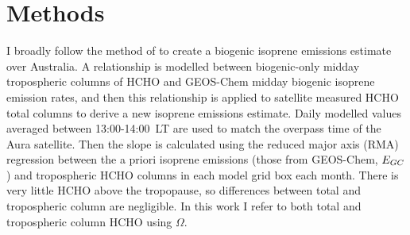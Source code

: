 \section{Methods}
  \label{BioIsop:method}
  
  
  I broadly follow the method of \textcite{Palmer2001} to create a biogenic isoprene emissions estimate over Australia.
  A relationship is modelled between biogenic-only midday tropospheric columns of HCHO and GEOS-Chem midday biogenic isoprene emission rates, and then this relationship is applied to satellite measured HCHO total columns to derive a new isoprene emissions estimate.
  Daily modelled values averaged between 13:00-14:00~LT are used to match the overpass time of the Aura satellite.
  Then the slope is calculated using the reduced major axis (RMA) regression between the a priori isoprene emissions (those from GEOS-Chem, $E_{GC}$) and tropospheric HCHO columns in each model grid box each month.
  There is very little HCHO above the tropopause, so differences between total and tropospheric column are negligible.
  In this work I refer to both total and tropospheric column HCHO using $\Omega$.
  
  
